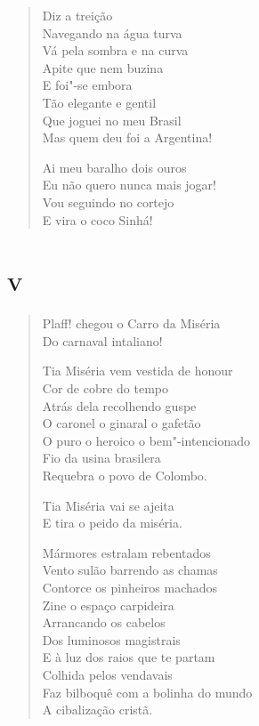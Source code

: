 {\begin{verse}
Diz a treição\\
Navegando na água turva\\
Vá pela sombra e na curva\\
Apite que nem buzina\\
E foi"-se embora\\
Tão elegante e gentil\\
Que joguei no meu Brasil\\
Mas quem deu foi a Argentina!

\qquad\qquad\quad Ai meu baralho dois ouros\\
\qquad\quad Eu não quero nunca mais jogar!\\
\quad Vou seguindo no cortejo\\
E vira o coco Sinhá!
\end{verse}

\chapter[«Plaff! chegou o Carro da Miséria»]{\textsc{v}}

\begin{verse}
Plaff! chegou o Carro da Miséria\\
Do carnaval intaliano!

Tia Miséria vem vestida de honour\\
Cor de cobre do tempo\\
Atrás dela recolhendo guspe\\
O caronel o ginaral o gafetão\\
O puro o heroico o bem"-intencionado\\
Fio da usina brasilera\\
Requebra o povo de Colombo.

Tia Miséria vai se ajeita\\
E tira o peido da miséria.

Mármores estralam rebentados\\
Vento sulão barrendo as chamas\\
Contorce os pinheiros machados\\
Zine o espaço carpideira\\
Arrancando os cabelos\\
Dos luminosos magistrais\\
E à luz dos raios que te partam\\
Colhida pelos vendavais\\
Faz bilboquê com a bolinha do mundo\\
A cibalização cristã.
\end{verse}

}
